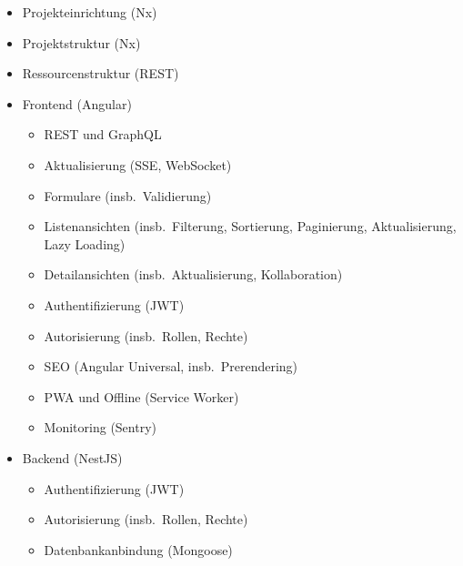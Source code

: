 \begin{itemize}
    \item Projekteinrichtung (Nx)
    \item Projektstruktur (Nx)
    \item Ressourcenstruktur (REST)
    \item Frontend (Angular)
    \begin{itemize}
        \item REST und GraphQL
        \item Aktualisierung (SSE, WebSocket)
        \item Formulare (insb.\ Validierung)
        \item Listenansichten (insb.\ Filterung, Sortierung, Paginierung, Aktualisierung, Lazy Loading)
        \item Detailansichten (insb.\ Aktualisierung, Kollaboration)
        \item Authentifizierung (JWT)
        \item Autorisierung (insb.\ Rollen, Rechte)
        \item SEO (Angular Universal, insb.\ Prerendering)
        \item PWA und Offline (Service Worker)
        \item Monitoring (Sentry)
    \end{itemize}
    \item Backend (NestJS)
    \begin{itemize}
        \item Authentifizierung (JWT)
        \item Autorisierung (insb.\ Rollen, Rechte)
        \item Datenbankanbindung (Mongoose)

\end{itemize}
\end{itemize}
